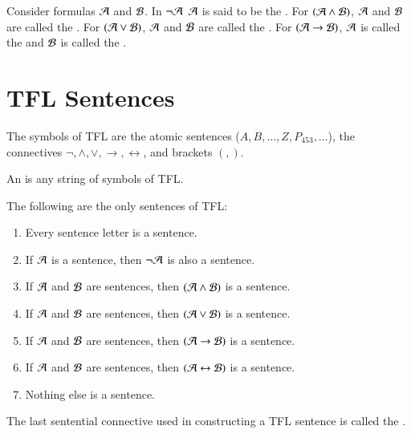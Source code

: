 \documentclass[12pt, a4paper, twoside, openright, titlepage]{book}
\begin{document}
\begin{defn}{}{}
    Consider formulas $\mathcal{A}$ and $\mathcal{B}$. In $\lnot \mathcal{A}$ $\mathcal{A}$ is said to be the . For $(\mathcal{A} \wedge \mathcal{B})$, $\mathcal{A}$ and $\mathcal{B}$ are called the . For $(\mathcal{A} \lor \mathcal{B})$, $\mathcal{A}$ and $\mathcal{B}$ are called the . For $(\mathcal{A} \rightarrow \mathcal{B})$, $\mathcal{A}$ is called the  and $\mathcal{B}$ is called the .
\end{defn}


\section{\textsection TFL Sentences}

\begin{defn}{}{}
    The symbols of TFL are the atomic sentences ($A,B,...,Z,P_{453},...$), the connectives $\lnot,\wedge,\lor,\rightarrow,\leftrightarrow$, and brackets $(,)$.
\end{defn}

\begin{defn}{}{}
    An  is any string of symbols of TFL.
\end{defn}


\begin{defn}{}{}
    The following are the only sentences of TFL:
    \begin{enumerate}
        \item Every sentence letter is a sentence.
        \item If $\mathcal{A}$ is a sentence, then $\lnot \mathcal{A}$ is also a sentence.
        \item If $\mathcal{A}$ and $\mathcal{B}$ are sentences, then $(\mathcal{A}\wedge \mathcal{B})$ is a sentence.
        \item If $\mathcal{A}$ and $\mathcal{B}$ are sentences, then $(\mathcal{A}\lor \mathcal{B})$ is a sentence.
        \item If $\mathcal{A}$ and $\mathcal{B}$ are sentences, then $(\mathcal{A}\rightarrow \mathcal{B})$ is a sentence.
        \item If $\mathcal{A}$ and $\mathcal{B}$ are sentences, then $(\mathcal{A}\leftrightarrow \mathcal{B})$ is a sentence.
        \item Nothing else is a sentence.
    \end{enumerate}
    The last sentential connective used in constructing a TFL sentence is called the .
\end{defn}
\end{document}
